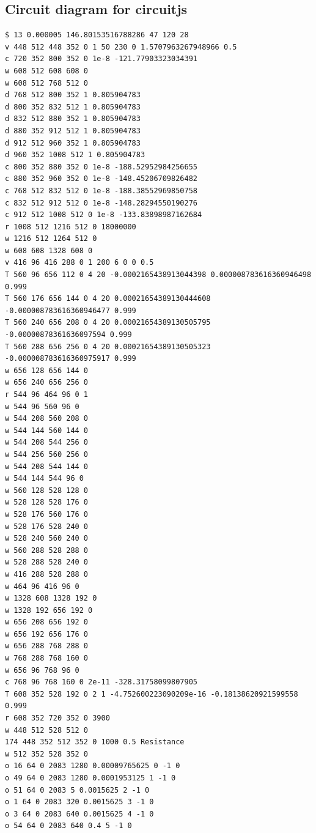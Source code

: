 \documentclass{article}
\begin{document}
\subsection{Circuit diagram for circuitjs}
\label{s:app:circuit}
\begin{verbatim}
$ 13 0.000005 146.80153516788286 47 120 28
v 448 512 448 352 0 1 50 230 0 1.5707963267948966 0.5
c 720 352 800 352 0 1e-8 -121.77903323034391
w 608 512 608 608 0
w 608 512 768 512 0
d 768 512 800 352 1 0.805904783
d 800 352 832 512 1 0.805904783
d 832 512 880 352 1 0.805904783
d 880 352 912 512 1 0.805904783
d 912 512 960 352 1 0.805904783
d 960 352 1008 512 1 0.805904783
c 800 352 880 352 0 1e-8 -188.52952984256655
c 880 352 960 352 0 1e-8 -148.45206709826482
c 768 512 832 512 0 1e-8 -188.38552969850758
c 832 512 912 512 0 1e-8 -148.28294550190276
c 912 512 1008 512 0 1e-8 -133.83898987162684
r 1008 512 1216 512 0 18000000
w 1216 512 1264 512 0
w 608 608 1328 608 0
v 416 96 416 288 0 1 200 6 0 0 0.5
T 560 96 656 112 0 4 20 -0.0002165438913044398 0.000008783616360946498 0.999
T 560 176 656 144 0 4 20 0.00021654389130444608 -0.000008783616360946477 0.999
T 560 240 656 208 0 4 20 0.00021654389130505795 -0.00000878361636097594 0.999
T 560 288 656 256 0 4 20 0.00021654389130505323 -0.000008783616360975917 0.999
w 656 128 656 144 0
w 656 240 656 256 0
r 544 96 464 96 0 1
w 544 96 560 96 0
w 544 208 560 208 0
w 544 144 560 144 0
w 544 208 544 256 0
w 544 256 560 256 0
w 544 208 544 144 0
w 544 144 544 96 0
w 560 128 528 128 0
w 528 128 528 176 0
w 528 176 560 176 0
w 528 176 528 240 0
w 528 240 560 240 0
w 560 288 528 288 0
w 528 288 528 240 0
w 416 288 528 288 0
w 464 96 416 96 0
w 1328 608 1328 192 0
w 1328 192 656 192 0
w 656 208 656 192 0
w 656 192 656 176 0
w 656 288 768 288 0
w 768 288 768 160 0
w 656 96 768 96 0
c 768 96 768 160 0 2e-11 -328.31758099807905
T 608 352 528 192 0 2 1 -4.752600223090209e-16 -0.18138620921599558 0.999
r 608 352 720 352 0 3900
w 448 512 528 512 0
174 448 352 512 352 0 1000 0.5 Resistance
w 512 352 528 352 0
o 16 64 0 2083 1280 0.00009765625 0 -1 0
o 49 64 0 2083 1280 0.0001953125 1 -1 0
o 51 64 0 2083 5 0.0015625 2 -1 0
o 1 64 0 2083 320 0.0015625 3 -1 0
o 3 64 0 2083 640 0.0015625 4 -1 0
o 54 64 0 2083 640 0.4 5 -1 0
\end{verbatim}




\end{document}
